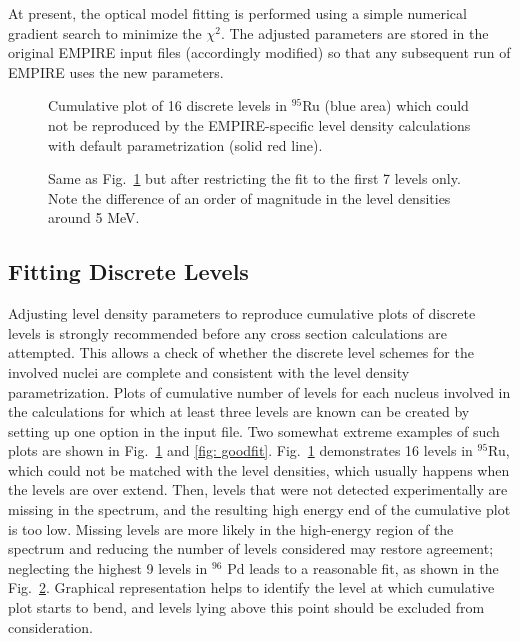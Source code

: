 At present, the optical model fitting is performed using a simple numerical
gradient search to minimize the $\chi^{2}$. The adjusted parameters are
stored in the original EMPIRE input files (accordingly modified) so that any
subsequent run of EMPIRE uses the new parameters.

\begin{figure}[tbp]
\caption{Cumulative plot of 16 discrete levels in $^{95}$Ru (blue area)
which could not be reproduced by the EMPIRE-specific level density
calculations with default parametrization (solid red line).}
\label{fig: badfit}
\end{figure}

\begin{figure}[tbp]
\caption{Same as Fig.~\protect\ref{fig: badfit} but after restricting the
fit to the first 7 levels only. Note the difference of an order of magnitude
in the level densities around 5 MeV.}
\label{fig: goodfit}
\end{figure}

\subsection{Fitting Discrete Levels}

Adjusting level density parameters to reproduce cumulative plots of discrete
levels is strongly recommended before any cross section calculations are
attempted. This allows a check of whether the discrete level schemes for the
involved nuclei are complete and consistent with the level density
parametrization. Plots of cumulative number of levels for each nucleus
involved in the calculations for which at least three levels are known can
be created by setting up one option in the input file. Two somewhat extreme
examples of such plots are shown in Fig.~\ref{fig: badfit} and \ref{fig:
goodfit}. Fig.~\ref{fig: badfit} demonstrates 16 levels in $^{95}$Ru, which
could not be matched with the level densities, which usually happens when
the levels are over extend. Then, levels that were not detected
experimentally are missing in the spectrum, and the resulting high energy
end of the cumulative plot is too low. Missing levels are more likely in the
high-energy region of the spectrum and reducing the number of levels
considered may restore agreement; neglecting the highest 9 levels in $^{96}$%
Pd leads to a reasonable fit, as shown in the Fig.~\ref{fig: goodfit}.
Graphical representation helps to identify the level at which cumulative
plot starts to bend, and levels lying above this point should be excluded
from consideration.

